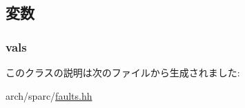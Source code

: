 \subsection{変数}
\hypertarget{classSparcISA_1_1SparcFault_a8b3c2006cfd550d551232a82b397bbca}{
\subsubsection[{vals}]{ {\bf vals}}}
\label{classSparcISA_1_1SparcFault_a8b3c2006cfd550d551232a82b397bbca}


このクラスの説明は次のファイルから生成されました:\begin{DoxyCompactItemize}
\item 
arch/sparc/\hyperlink{arch_2sparc_2faults_8hh}{faults.hh}\end{DoxyCompactItemize}
